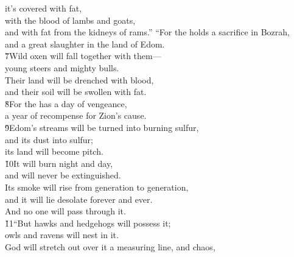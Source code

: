 \begin{poetry}
\poemll    it's covered with fat, \\
\poeml with the blood of lambs and goats, \\
\poemll    and with fat from the kidneys of rams.''
\poeml ``For the  holds a sacrifice in Bozrah, \\
\poemll    and a great slaughter in the land of Edom. \\
\poeml \v{7}Wild oxen will fall together with them--- \\
\poemll    young steers and mighty bulls. \\
\poeml Their land will be drenched with blood, \\
\poemll    and their soil will be swollen with fat. \\
\poeml \v{8}For the  has a day of vengeance, \\
\poemll    a year of recompense for Zion's cause. \\
\poeml \v{9}Edom's streams will be turned into burning sulfur, \\
\poemll    and its dust into sulfur; \\
\poemlll       its land will become pitch. \\
\poeml \v{10}It will burn night and day, \\
\poemll    and will never be extinguished. \\
\poeml Its smoke will rise from generation to generation, \\
\poemll    and it will lie desolate forever and ever. \\
\poemlll       And no one will pass through it. \\
\poeml \v{11}``But hawks and hedgehogs will possess it; \\
\poemll    owls and ravens will nest in it. \\
\poeml God will stretch out over it a measuring line, and chaos, \\

\end{poetry}
